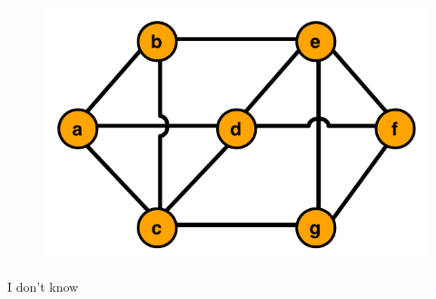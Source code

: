 \documentclass[12pt]{article}
\begin{document}
\begin{enumerate}
\begin{figure}[h!]
\begin{center}
\includegraphics[scale=0.7]{graph_mst.pdf} 
\end{center}
\end{figure}

	I don't know


	
	

	
\end{enumerate}
\end{document}
